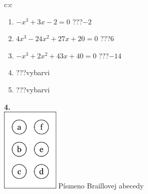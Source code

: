 \documentclass[10pt]{report}
\begin{document}
\begin{tabular}{c:c}
\begin{minipage}[c][104.5mm][t]{0.5\linewidth}
\begin{center}
\begin{minipage}{0.79\linewidth}
\begin{center}
\begin{varwidth}{\linewidth}
\begin{enumerate}
\item $-x^3+3x-2=0$\quad \dotfill\; ???\;\dotfill \quad $-2$
\item $4x^3-24x^2+27x+20=0$\quad \dotfill\; ???\;\dotfill \quad $6$
\item $-x^3+2x^2+43x+40=0$\quad \dotfill\; ???\;\dotfill \quad $-14$
\item \quad \dotfill\; ???\;\dotfill \quad vybarvi
\item \quad \dotfill\; ???\;\dotfill \quad vybarvi
\end{enumerate}
\end{varwidth}
\end{center}
\end{minipage}
\begin{minipage}{0.20\linewidth}
\begin{center}
{\Huge\bfseries 4.} \\[2mm]
\includegraphics[height=40mm]{../images/braille.png}
{\small Písmeno Braillovej abecedy}
\end{center}
\end{minipage}
\end{center}
\end{minipage}
%
\end{tabular}
\newpage
\thispagestyle{empty}
\end{document}

